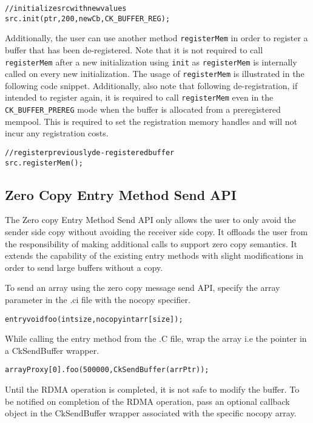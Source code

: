 \begin{alltt}
// initialize src with new values
src.init(ptr, 200, newCb, CK_BUFFER_REG);
\end{alltt}

Additionally, the user can use another method \texttt{registerMem} in order to register a buffer that has
been de-registered. Note that it is not required to call \texttt{registerMem} after a new initialization
using \texttt{init} as \texttt{registerMem} is internally called on every new initialization. The usage of
\texttt{registerMem} is illustrated in the following code snippet. Additionally, also note that following
de-registration, if intended to register again, it is required to call \texttt{registerMem} even in the
{\tt CK\_BUFFER\_PREREG} mode when the buffer is allocated from a preregistered
mempool. This is required to set the registration memory handles and will not incur any registration costs.

\begin{alltt}
// register previously de-registered buffer
src.registerMem();
\end{alltt}

\subsection{Zero Copy Entry Method Send API}
The Zero copy Entry Method Send API only allows the user to only avoid the sender
side copy without avoiding the receiver side copy. It offloads the user from the
responsibility of making additional calls to support zero copy semantics.
It extends the capability of the existing entry methods with slight modifications
in order to send large buffers without a copy.

\vspace{0.1in}
\noindent
To send an array using the zero copy message send API, specify the array parameter
in the .ci file with the nocopy specifier.

\begin{alltt}
entry void foo (int size, nocopy int arr[size]);
\end{alltt}

While calling the entry method from the .C file, wrap the array i.e the
pointer in a CkSendBuffer wrapper.

\begin{alltt}
arrayProxy[0].foo(500000, CkSendBuffer(arrPtr));
\end{alltt}

Until the RDMA operation is completed, it is not safe to modify the buffer.
To be notified on completion of the RDMA operation, pass an optional callback object
in the CkSendBuffer wrapper associated with the specific nocopy array.

